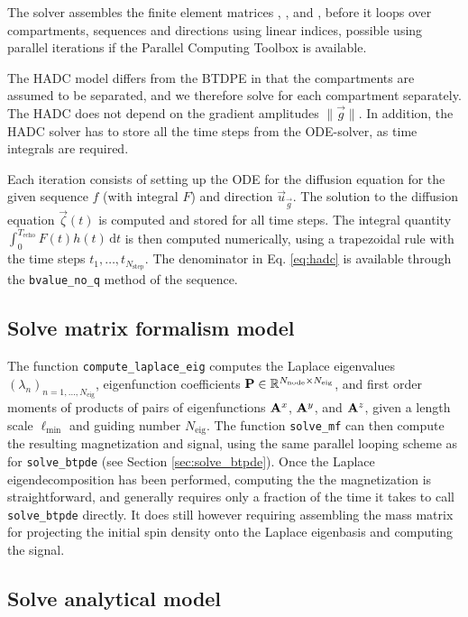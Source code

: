 \documentclass[a4paper]{article}
\begin{document}
The solver assembles the finite element matrices , , and , before it loops over compartments, sequences and directions using linear indices, possible using parallel iterations if the Parallel Computing Toolbox is available.

The HADC model differs from the BTDPE in that the compartments are assumed to be separated, and we therefore solve for each compartment separately. The HADC does not depend on the gradient amplitudes $\|\vec{g}\|$. In addition, the HADC solver has to store all the time steps from the ODE-solver, as time integrals are required.

Each iteration consists of setting up the ODE for the diffusion equation for the given sequence $f$ (with integral $F$) and direction $\vec{u}_{\vec{g}}$. The solution to the diffusion equation $\vec{\zeta}(t)$ is computed and stored for all time steps. The integral quantity $\int_0^{T_\text{echo}} F(t) h(t)\, \mathrm{d}t$ is then computed numerically, using a trapezoidal rule with the time steps $t_1, \dots, t_{N_\text{step}}$. The denominator in Eq. \eqref{eq:hadc} is available through the \verb+bvalue_no_q+ method of the sequence.


\subsection{Solve matrix formalism model} \label{sec:solve_mf}

The function \verb+compute_laplace_eig+ computes the Laplace eigenvalues $(\lambda_n)_{n=1, \dots, N_\text{eig}}$, eigenfunction coefficients $\mathbf{P} \in \mathbb{R}^{N_\text{node} \times N_\text{eig}}$, and first order moments of products of pairs of eigenfunctions $\mathbf{A}^x$, $\mathbf{A}^y$, and $\mathbf{A}^z$, given a length scale $\ell_\text{min}$ and guiding number $N_\text{eig}$. The function \verb+solve_mf+ can then compute the resulting magnetization and signal, using the same parallel looping scheme as for \verb+solve_btpde+ (see Section \ref{sec:solve_btpde}). Once the Laplace eigendecomposition has been performed, computing the the magnetization is straightforward, and generally requires only a fraction of the time it takes to call \verb+solve_btpde+ directly. It does still however requiring assembling the mass matrix for projecting the initial spin density onto the Laplace eigenbasis and computing the signal.


\subsection{Solve analytical model} \label{sec:solve_analytical}
\end{document}
